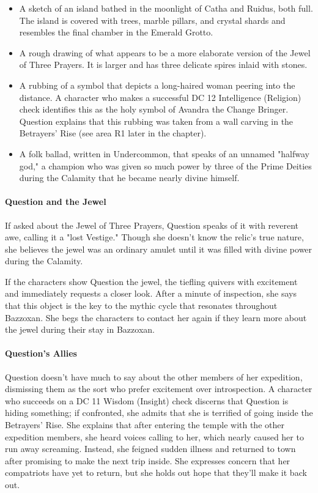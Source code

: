 \documentclass[10pt,a4paper,twoside,bg=print,twocolumn,openany,nodeprecatedcode]{dndbook}
\begin{document}
\begin{itemize}
\item A sketch of an island bathed in the moonlight of Catha and Ruidus, both full. The island is covered with trees, marble pillars, and crystal shards and resembles the final chamber in the Emerald Grotto.
\item A rough drawing of what appears to be a more elaborate version of the Jewel of Three Prayers. It is larger and has three delicate spires inlaid with stones.
\item A rubbing of a symbol that depicts a long-haired woman peering into the distance. A character who makes a successful DC 12 Intelligence (Religion) check identifies this as the holy symbol of Avandra the Change Bringer. Question explains that this rubbing was taken from a wall carving in the Betrayers' Rise (see area R1 later in the chapter).
\item A folk ballad, written in Undercommon, that speaks of an unnamed "halfway god," a champion who was given so much power by three of the Prime Deities during the Calamity that he became nearly divine himself.
\end{itemize}

\paragraph{Question and the Jewel}
If asked about the Jewel of Three Prayers, Question speaks of it with reverent awe, calling it a "lost Vestige." Though she doesn't know the relic's true nature, she believes the jewel was an ordinary amulet until it was filled with divine power during the Calamity.

If the characters show Question the jewel, the tiefling quivers with excitement and immediately requests a closer look. After a minute of inspection, she says that this object is the key to the mythic cycle that resonates throughout Bazzoxan. She begs the characters to contact her again if they learn more about the jewel during their stay in Bazzoxan.

\paragraph{Question's Allies}
Question doesn't have much to say about the other members of her expedition, dismissing them as the sort who prefer excitement over introspection. A character who succeeds on a DC 11 Wisdom (Insight) check discerns that Question is hiding something; if confronted, she admits that she is terrified of going inside the Betrayers' Rise. She explains that after entering the temple with the other expedition members, she heard voices calling to her, which nearly caused her to run away screaming. Instead, she feigned sudden illness and returned to town after promising to make the next trip inside. She expresses concern that her compatriots have yet to return, but she holds out hope that they'll make it back out.
\end{document}
